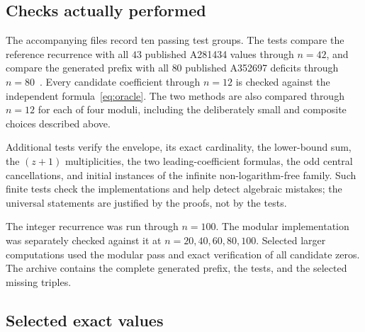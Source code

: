 \documentclass[11pt]{article}
\numberwithin{equation}{section}
\theoremstyle{definition}
\theoremstyle{remark}
\begin{document}
\subsection{Checks actually performed}

The accompanying files record ten passing test groups. The tests compare the
reference recurrence with all $43$ published A281434 values through $n=42$,
and compare the generated prefix with all $80$ published A352697 deficits
through $n=80$~\cite{oeis281434,oeis352697}. Every candidate coefficient
through $n=12$ is checked against the independent formula~\eqref{eq:oracle}.
The two methods are also compared through $n=12$ for each of four moduli,
including the deliberately small and composite choices described above.

Additional tests verify the envelope, its exact cardinality, the lower-bound
sum, the $(z+1)$ multiplicities, the two leading-coefficient formulas,
the odd central cancellations, and initial instances of the infinite
non-logarithm-free family. Such finite tests check the implementations and
help detect algebraic mistakes; the universal statements are justified by
the proofs, not by the tests.

The integer recurrence was run through $n=100$. The modular implementation
was separately checked against it at $n=20,40,60,80,100$. Selected larger
computations used the modular pass and exact verification of all candidate
zeros. The archive contains the complete generated prefix, the tests, and
the selected missing triples.

\subsection{Selected exact values}
\end{document}
